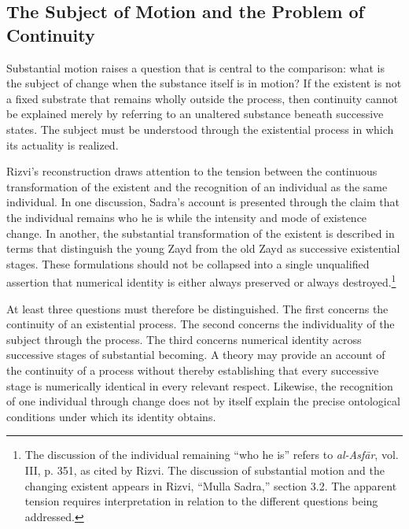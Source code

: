 \subsection{The Subject of Motion and the Problem of Continuity}
\label{subsec:ch08_s17_ss10}

\label{para:VS.B01.P01.C08.S17.SS10.P001}

Substantial motion raises a question
that is central to the comparison:
what is the subject of change
when the substance itself is
in motion? If the existent
is not a fixed substrate
that remains wholly outside
the process, then continuity
cannot be explained merely
by referring to an unaltered
substance beneath successive
states. The subject must
be understood through the
existential process in which
its actuality is realized.

\label{para:VS.B01.P01.C08.S17.SS10.P002}

Rizvi's reconstruction draws
attention to the tension between
the continuous transformation
of the existent and the
recognition of an individual
as the same individual.
In one discussion, Sadra's
account is presented through
the claim that the individual
remains who he is while
the intensity and mode of
existence change. In another,
the substantial transformation
of the existent is described
in terms that distinguish
the young Zayd from the
old Zayd as successive
existential stages. These
formulations should not be
collapsed into a single
unqualified assertion that
numerical identity is either
always preserved or always
destroyed.\footnote{The discussion
of the individual remaining
``who he is'' refers to
\textit{al-Asfār}, vol. III,
p. 351, as cited by Rizvi.
The discussion of substantial
motion and the changing
existent appears in Rizvi,
``Mulla Sadra,'' section 3.2.
The apparent tension requires
interpretation in relation
to the different questions
being addressed.}

\label{para:VS.B01.P01.C08.S17.SS10.P003}

At least three questions must
therefore be distinguished.
The first concerns the continuity
of an existential process.
The second concerns the
individuality of the subject
through the process. The
third concerns numerical
identity across successive
stages of substantial becoming.
A theory may provide an
account of the continuity
of a process without thereby
establishing that every
successive stage is numerically
identical in every relevant
respect. Likewise, the
recognition of one individual
through change does not
by itself explain the precise
ontological conditions under
which its identity obtains.

